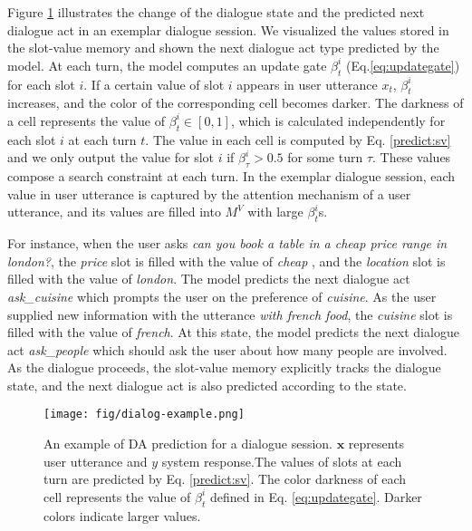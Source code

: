 Figure \ref{fig:full-dialog} illustrates the change of the dialogue state and the predicted next dialogue act in an exemplar dialogue session. We visualized the values stored in the slot-value memory and shown the next dialogue act type predicted by the model.
At each turn, the model computes an update gate $\beta_t^i$ (Eq.\ref{eq:updategate}) for each slot $i$.
If a certain value of slot $i$ appears in user utterance $x_t$, $\beta_t^i$ increases, and the color of the corresponding cell becomes darker.
The darkness of a cell represents the value of $\beta_t^i \in [0, 1]$, which is calculated independently for each slot $i$ at each turn $t$.
The value in each cell is computed by Eq. \ref{predict:sv} and we only output the value for slot $i$ if $\beta_{\tau}^i > 0.5$ for some turn $\tau$. 
These values compose a search constraint at each turn.
In the exemplar dialogue session, each value in user utterance is captured by the attention mechanism of a user utterance, 
and its values are filled into $M^V$ with large $\beta_t^i$s.

For instance, when the user asks {\em can you book a table in a cheap price range in london?}, the {\em price} slot is filled with the value of {\em cheap }, and the {\em location} slot is filled with the value of {\em london}. The model predicts the next dialogue act {\em ask\_cuisine} which prompts the user on the preference of {\em cuisine}. As the user supplied new information with the utterance {\em with french food}, the {\em cuisine} slot is filled with the value of {\em french}. At this state, the model predicts the next dialogue act  {\em ask\_people} which should ask the user about how many people are involved. As the dialogue proceeds, the slot-value memory explicitly tracks the dialogue state, and the next dialogue act is also predicted according to the state. 

\begin{figure}
  \small
  \renewcommand\floatpagefraction{.9}   
\renewcommand\topfraction{.9}  
\renewcommand\bottomfraction{.9}  
\renewcommand\textfraction{.1}
  \texttt{[image: fig/dialog-example.png]}
  \caption{An example of DA prediction for a dialogue session. $\bm{x}$ represents user utterance and ${y}$ system response.The values of slots at each turn are predicted by Eq. \ref{predict:sv}. The color darkness of each cell represents the value of ${\beta}_t^i$ defined in Eq. \ref{eq:updategate}. Darker colors indicate larger values.}
  \label{fig:full-dialog}
\end{figure}


